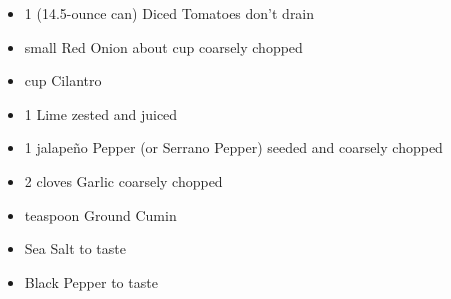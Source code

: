 \begin{itemize}
  \item 1 (14.5-ounce can) Diced Tomatoes don't drain
  \item {} small Red Onion about  cup coarsely chopped
  \item {} cup Cilantro
  \item 1 Lime zested and juiced
  \item 1 jalapeño Pepper (or Serrano Pepper) seeded and coarsely chopped
  \item 2 cloves Garlic coarsely chopped
  \item {} teaspoon Ground Cumin
  \item Sea Salt to taste
  \item Black Pepper to taste
\end{itemize}

